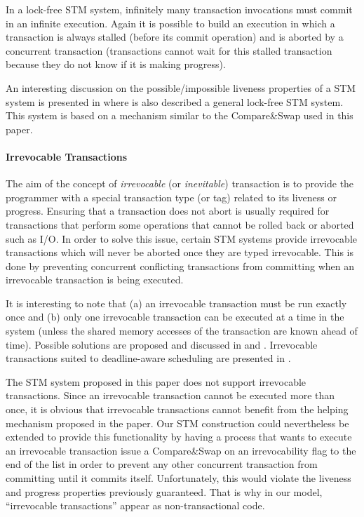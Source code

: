 In a lock-free STM system, infinitely many transaction invocations must 
commit   in  an infinite  execution.  Again it  is  possible  to build   an
execution in which a transaction is always stalled  
(before its commit operation) and is aborted by a concurrent transaction  
(transactions cannot wait for this stalled transaction because they do not 
know if it is making progress).

An interesting discussion on the possible/impossible liveness properties 
of a STM system is presented in \cite{GK10} where is 
also described  a general  lock-free STM system. This  system is 
based on a mechanism similar to the Compare\&Swap used in this paper.

\paragraph{Irrevocable Transactions} 
The  aim  of  the  concept   of  {\it  irrevocable}  (or  {\it  inevitable})
transaction  is  to   provide  the   programmer  with  a  special 
transaction type (or tag) related to its liveness or progress. 
%
Ensuring  that  a  transaction  does  not abort  is  usually  required  for
transactions  
that perform some operations that cannot be rolled back or aborted such as I/O.
In order to solve this issue, certain STM systems provide irrevocable 
transactions which will never be aborted once they are typed  irrevocable.
This is done by preventing concurrent conflicting transactions from 
committing when an irrevocable transaction is being executed.

It is interesting to note that (a) an irrevocable transaction must be run 
exactly  once and (b) only one irrevocable transaction can be executed at 
a time in the system (unless the shared memory accesses of the transaction 
are known ahead of time).
Possible solutions are proposed and discussed  in 
\cite{SSDMS08}  and   \cite{WSA08}.  Irrevocable  transactions   suited  to
deadline-aware scheduling are presented  in \cite{MMFLMR11}. 

The STM system proposed in this paper does not support 
irrevocable transactions.
Since  an irrevocable   transaction cannot  be executed  more than  once,
it is obvious that irrevocable  transactions cannot  benefit from  the  
helping  mechanism  proposed in  the paper. 
Our STM construction  could nevertheless be extended to provide this 
functionality  by having  a process  that  wants to  execute an  irrevocable
transaction issue a Compare\&Swap on an irrevocability flag to the end  
of the list in order to  prevent any other concurrent  transaction from
committing until  it commits itself. Unfortunately,  this  would violate the
liveness and progress properties previously guaranteed. That is why in our
model,  ``irrevocable transactions'' appear as non-transactional code. 



